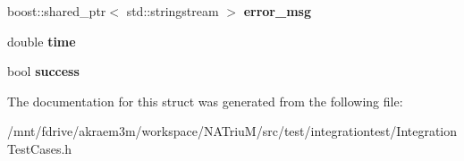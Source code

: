 \begin{DoxyCompactItemize}
\item 
\hypertarget{structIntegrationTestCases_1_1TestResult_aa812583c009dff84b47de7ab3881041b}{
boost::shared\_\-ptr$<$ std::stringstream $>$ {\bfseries error\_\-msg}}
\label{structIntegrationTestCases_1_1TestResult_aa812583c009dff84b47de7ab3881041b}

\item 
\hypertarget{structIntegrationTestCases_1_1TestResult_a468ebaaabfe8ac55ddf3c2c57b337d29}{
double {\bfseries time}}
\label{structIntegrationTestCases_1_1TestResult_a468ebaaabfe8ac55ddf3c2c57b337d29}

\item 
\hypertarget{structIntegrationTestCases_1_1TestResult_a37e9cd24ef8bb5d5abd6f8aa3632399a}{
bool {\bfseries success}}
\label{structIntegrationTestCases_1_1TestResult_a37e9cd24ef8bb5d5abd6f8aa3632399a}

\end{DoxyCompactItemize}


The documentation for this struct was generated from the following file:\begin{DoxyCompactItemize}
\item 
/mnt/fdrive/akraem3m/workspace/NATriuM/src/test/integrationtest/IntegrationTestCases.h\end{DoxyCompactItemize}
